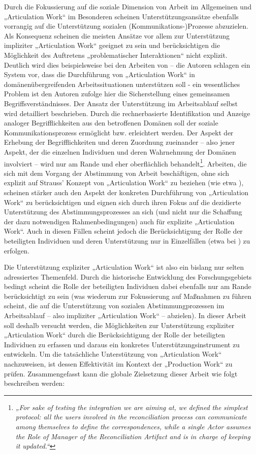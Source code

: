 Durch die Fokussierung auf die soziale Dimension von Arbeit im Allgemeinen und „Articulation Work“ im Besonderen scheinen Unterstützungsansätze ebenfalls vorrangig auf die Unterstützung sozialen (Kommunikations-)Prozesse abzuzielen. Als Konsequenz scheinen die meisten Ansätze vor allem zur Unterstützung impliziter „Articulation Work“ geeignet zu sein und berücksichtigen die Möglichkeit des Auftretens „problematischer Interaktionen“ nicht explizit. Deutlich wird dies beispielsweise bei den Arbeiten von \citep{Sarini02} -- die Autoren schlagen ein System vor, dass die Durchführung von „Articulation Work“ in domänenübergreifenden Arbeitssituationen unterstützen soll - ein wesentliches Problem ist den Autoren zufolge hier die Sicherstellung eines gemeinsamen Begriffsverständnisses. Der Ansatz der Unterstützung im Arbeitsablauf selbst wird detailliert beschrieben. Durch die rechnerbasierte Identifikation und Anzeige analoger Begrifflichkeiten aus den betroffenen Domänen soll der soziale Kommunikationsprozess ermöglicht bzw. erleichtert werden. Der Aspekt der Erhebung der Begrifflichkeiten und deren Zuordnung zueinander -- also jener Aspekt, der die einzelnen Individuen und deren Wahrnehmung der Domänen involviert -- wird nur am Rande und eher oberflächlich behandelt\footnote{\emph{„For sake of testing the integration we are aiming at, we defined the simplest protocol: all the users involved in the reconciliation process can communicate among themselves to define the correspondences, while a single Actor assumes the Role of Manager of the Reconciliation Artifact and is in charge of keeping it updated.“}\citep[][S. 10]{Sarini02}}. Arbeiten, die sich mit dem Vorgang der Abstimmung von Arbeit beschäftigen, ohne sich explizit auf Strauss' Konzept von „Articulation Work“ zu beziehen (wie etwa  \citep{Jorgensen04}), scheinen stärker auch den Aspekt der konkreten Durchführung von „Articulation Work“ zu berücksichtigen und eignen sich durch ihren Fokus auf die dezidierte Unterstützung des Abstimmungsprozesses an sich (und nicht nur die Schaffung der dazu notwendigen Rahmenbedingungen) auch für explizite „Articulation Work“. Auch in diesen Fällen scheint jedoch die Berücksichtigung der Rolle der beteiligten Individuen und deren Unterstützung nur in Einzelfällen (etwa bei \citet{Herrmann02}) zu erfolgen.

Die Unterstützung expliziter „Articulation Work“ ist also ein bislang nur selten adressiertes Themenfeld. Durch die historische Entwicklung des Forschungsgebiets bedingt scheint die Rolle der beteiligten Individuen dabei ebenfalls nur am Rande berücksichtigt zu sein (was wiederum zur Fokussierung auf Maßnahmen zu führen scheint, die auf die Unterstützung von sozialen Abstimmungprozessen im Arbeitsablauf -- also impliziter „Articulation Work“ -- abzielen). In dieser Arbeit soll deshalb versucht werden, die Möglichkeiten zur Unterstützung expliziter „Articulation Work“ durch die Berücksichtigung der Rolle der beteiligten Individuen zu erfassen und daraus ein konkretes Unterstützungsinstrument zu entwickeln. Um die tatsächliche Unterstützung von „Articulation Work“ nachzuweisen, ist dessen Effektivität im Kontext der „Production Work“ zu prüfen. Zusammengefasst kann die globale Zielsetzung dieser Arbeit wie folgt beschreiben werden:

